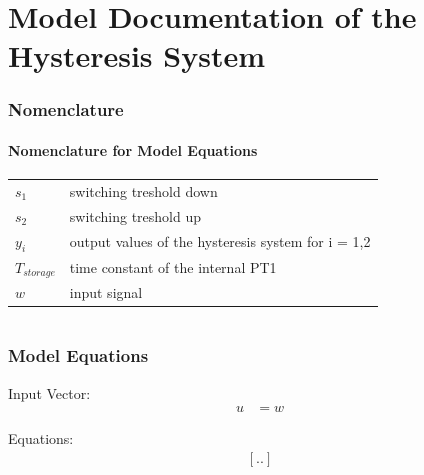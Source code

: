 \documentclass[10pt,a4paper]{article}
\begin{document}
	\part*{Model Documentation of the \\ Hysteresis System} %
	
	
	\section{Nomenclature} %
	\subsection{Nomenclature for Model Equations} %
	
	\begin{tabular}{ll}
		$s_1$ & switching treshold down \\
		$s_2$ & switching treshold up \\
		$y_i$ & output values of the hysteresis system for i = 1,2 \\
		$T_{storage}$ & time constant of the internal PT1 \\
		$w$ & input signal \\
					
	\end{tabular}
	 
	
	\begin{tabular}{ll}

	\end{tabular}
	
	
	\section{Model Equations} %
	
	Input Vector:
	\begin{align*}
		u &= w
	\end{align*}
	
	\noindent Equations:			
	\begin{subequations}
	\begin{align}
		[..]
	\end{align}
	\end{subequations}
\end{document}
